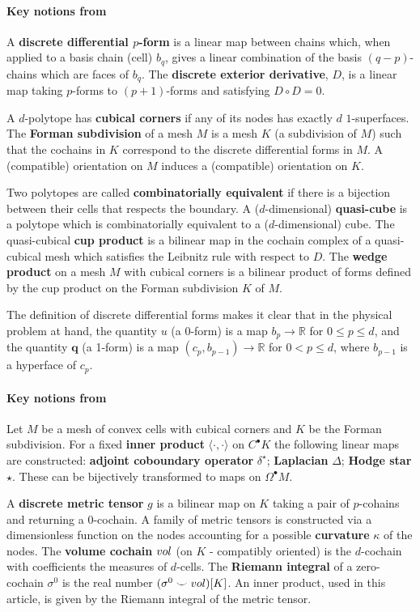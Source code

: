 \documentclass{elsarticle}
\theoremstyle{definition}
\newcommand{\R}{\mathbb{R}} %
\newcommand{\inner}[2]{\langle#1,#2\rangle}
\newcommand{\vol}{\mathop{\rm vol}\nolimits} %
\begin{document}
\paragraph{Key notions from }
A \textbf{discrete differential $p$-form} is a linear map between chains which, when applied to a basis chain (cell) $b_q$, gives a linear combination of the basis $(q - p)$-chains which are faces of $b_q$.
The \textbf{discrete exterior derivative}, $D$, is a linear map taking $p$-forms to $(p + 1)$-forms and satisfying $D \circ D = 0$.

A $d$-polytope has \textbf{cubical corners} if any of its nodes has exactly $d$ $1$-superfaces.
The \textbf{Forman subdivision} of a mesh $M$ is a mesh $K$ (a subdivision of $M$) such that the cochains in $K$ correspond to the discrete differential forms in $M$.
A (compatible) orientation on $M$ induces a (compatible) orientation on $K$.

Two polytopes are called \textbf{combinatorially equivalent} if there is a bijection between their cells that respects the boundary.
A ($d$-dimensional) \textbf{quasi-cube} is a polytope which is combinatorially equivalent to a ($d$-dimensional) cube.
The quasi-cubical \textbf{cup product} is a bilinear map in the cochain complex of a quasi-cubical mesh which satisfies the Leibnitz rule with respect to $D$.
The \textbf{wedge product} on a mesh $M$ with cubical corners is a bilinear product of forms defined by the cup product on the Forman subdivision $K$ of $M$.

The definition of discrete differential forms makes it clear that in the physical problem at hand, the quantity $u$ (a 0-form) is a map $b_p \to \R$ for $0 \le p \le d$, and the quantity $\mathbf{q}$ (a 1-form) is a map $(c_p, b_{p-1}) \to \R$ for $0 < p \le d$, where $b_{p-1}$ is a hyperface of $c_p$. 

\paragraph{Key notions from }
Let $M$ be a mesh of convex cells with cubical corners and $K$ be the Forman subdivision. For a fixed \textbf{inner product} $\inner{\cdot}{\cdot}$ on $C^\bullet K$ the following linear maps are constructed: \textbf{adjoint coboundary operator} $\delta^{\star}$; \textbf{Laplacian} $\Delta$; \textbf{Hodge star} $\star$.
These can be bijectively transformed to maps on $\Omega^\bullet M$.

A \textbf{discrete metric tensor} $g$ is a bilinear map on $K$ taking a pair of $p$-cohains and returning a $0$-cochain.
A family of metric tensors is constructed via a dimensionless function on the nodes accounting for a possible \textbf{curvature} $\kappa$ of the nodes.
The \textbf{volume cochain} $\vol$ (on $K$ - compatibly oriented) is the $d$-cochain with coefficients the measures of $d$-cells.
The \textbf{Riemann integral} of a zero-cochain $\sigma^0$ is the real number $(\sigma^0 \smile \vol)[K]$.
An inner product, used in this article, is given by the Riemann integral of the metric tensor.
\end{document}
